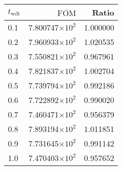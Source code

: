 \begin{tabular}{lrr}
\toprule
$t_{\mathrm{wdt}}$ & $\overline{\mathrm{FOM}}$ &    Ratio \\
\midrule
               0.1 &   7.800747$\times 10^{2}$ & 1.000000 \\
               0.2 &   7.960933$\times 10^{2}$ & 1.020535 \\
               0.3 &   7.550821$\times 10^{2}$ & 0.967961 \\
               0.4 &   7.821837$\times 10^{2}$ & 1.002704 \\
               0.5 &   7.739794$\times 10^{2}$ & 0.992186 \\
               0.6 &   7.722892$\times 10^{2}$ & 0.990020 \\
               0.7 &   7.460471$\times 10^{2}$ & 0.956379 \\
               0.8 &   7.893194$\times 10^{2}$ & 1.011851 \\
               0.9 &   7.731645$\times 10^{2}$ & 0.991142 \\
               1.0 &   7.470403$\times 10^{2}$ & 0.957652 \\
\bottomrule
\end{tabular}
